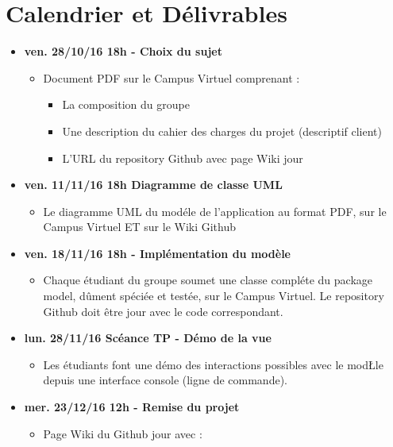 \chapter*{Calendrier et Délivrables}
\label{chap:Calendrier et Délivrables}

\begin{itemize}
    \item  \textbf{ven. 28/10/16 18h - Choix du sujet} 
    \begin{itemize}
        \item Document PDF sur le Campus Virtuel comprenant :
        \begin{itemize}
            \item La composition du groupe
            \item Une description du cahier des charges du projet (descriptif client)
            \item L’URL du repository Github avec page Wiki jour
        \end{itemize}
    \end{itemize}
    \item \textbf{ven. 11/11/16 18h Diagramme de classe UML}
    \begin{itemize}
        \item Le diagramme UML du modéle de l’application au format PDF, sur le Campus Virtuel ET sur le Wiki Github
    \end{itemize}
    \item \textbf{ven. 18/11/16 18h - Implémentation du modèle}
    \begin{itemize}
        \item Chaque étudiant du groupe soumet une classe compléte du package model, dûment spéciée et testée, sur le Campus Virtuel. Le repository Github doit être jour avec le code correspondant.
    \end{itemize}
    \item \textbf{lun. 28/11/16 Scéance TP - Démo de la vue}
    \begin{itemize}
        \item Les étudiants font une démo des interactions possibles avec le modŁle depuis une interface console (ligne de commande).
    \end{itemize}
     \item \textbf{mer. 23/12/16 12h - Remise du projet}
     \begin{itemize}
         \item Page Wiki du Github jour avec :

\end{itemize}
\end{itemize}
